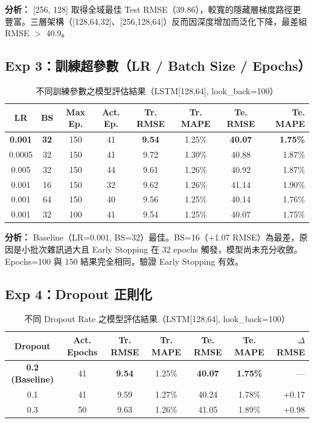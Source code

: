 \documentclass[12pt,a4paper]{article}
\begin{document}
\textbf{分析：} [256, 128] 取得全域最佳 Test RMSE（39.86），較寬的隱藏層梯度路徑更豐富。三層架構（[128,64,32]、[256,128,64]）反而因深度增加而泛化下降，最差組 RMSE $>$ 40.9。

\subsection{Exp 3：訓練超參數（LR / Batch Size / Epochs）}

\begin{table}[H]
\centering
\caption{不同訓練參數之模型評估結果（LSTM[128,64], look\_back=100）}
\small
\begin{tabular}{cccccccr}
\toprule
\textbf{LR} & \textbf{BS} & \textbf{Max Ep.} & \textbf{Act. Ep.} & \textbf{Tr. RMSE} & \textbf{Tr. MAPE} & \textbf{Te. RMSE} & \textbf{Te. MAPE} \\
\midrule
\rowcolor{bestrow}
\textbf{0.001} & \textbf{32} & 150 & 41 & \textbf{9.54} & 1.25\% & \textbf{40.07} & \textbf{1.75\%} \\
0.0005 & 32 & 150 & 41 & 9.72 & 1.30\% & 40.88 & 1.87\% \\
0.005  & 32 & 150 & 44 & 9.61 & 1.26\% & 40.92 & 1.87\% \\
0.001  & 16 & 150 & 32 & 9.62 & 1.26\% & 41.14 & 1.90\% \\
0.001  & 64 & 150 & 40 & 9.56 & 1.25\% & 40.14 & 1.76\% \\
0.001  & 32 & 100 & 41 & 9.54 & 1.25\% & 40.07 & 1.75\% \\
\bottomrule
\end{tabular}
\end{table}

\textbf{分析：} Baseline（LR=0.001, BS=32）最佳。BS=16（+1.07 RMSE）為最差，原因是小批次雜訊過大且 Early Stopping 在 32 epochs 觸發，模型尚未充分收斂。Epochs=100 與 150 結果完全相同，驗證 Early Stopping 有效。

\subsection{Exp 4：Dropout 正則化}

\begin{table}[H]
\centering
\caption{不同 Dropout Rate 之模型評估結果（LSTM[128,64], look\_back=100）}
\begin{tabular}{ccccccr}
\toprule
\textbf{Dropout} & \textbf{Act. Epochs} & \textbf{Tr. RMSE} & \textbf{Tr. MAPE} & \textbf{Te. RMSE} & \textbf{Te. MAPE} & \textbf{$\Delta$RMSE} \\
\midrule
\rowcolor{bestrow}
\textbf{0.2 (Baseline)} & 41 & \textbf{9.54} & 1.25\% & \textbf{40.07} & \textbf{1.75\%} & — \\
0.1 & 41 & 9.59 & 1.27\% & 40.24 & 1.78\% & +0.17 \\
0.3 & 50 & 9.63 & 1.26\% & 41.05 & 1.89\% & +0.98 \\
\bottomrule
\end{tabular}
\end{table}
\end{document}
